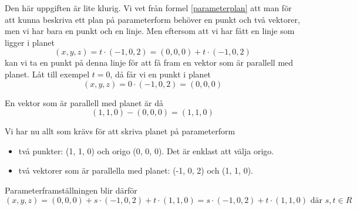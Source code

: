 \documentclass[../../main.tex]{subfiles}
\begin{document}
\begin{solution}{10}

Den här uppgiften är lite klurig. Vi vet från formel \ref{parameterplan} att man för att kunna beskriva ett plan på parameterform behöver en punkt och två vektorer, men vi har bara en punkt och en linje. Men eftersom att vi har fått en linje som ligger i planet 
\[(x, y, z) = t\cdot (-1, 0, 2) = (0, 0, 0) + t\cdot (-1, 0, 2)\]
kan vi ta en punkt på denna linje för att få fram en vektor som är parallell med planet. Låt till exempel $t = 0$, då får vi en punkt i planet
\[(x, y, z) = 0 \cdot (-1, 0, 2) = (0, 0, 0)\]

En vektor som är parallell med planet är då
\[(1, 1, 0) - (0, 0, 0) = (1, 1, 0)\] 

Vi har nu allt som krävs för att skriva planet på parameterform
\begin{itemize}
    \item två punkter: (1, 1, 0) och origo (0, 0, 0). Det är enklast att välja origo.
    \item två vektorer som är parallella med planet: (-1, 0, 2) och (1, 1, 0).
\end{itemize}

Parameterframställningen blir därför
\[(x, y, z) = (0, 0, 0) + s \cdot (-1, 0, 2) + t \cdot (1, 1, 0) = 
s \cdot (-1, 0, 2) + t \cdot (1, 1, 0) \text{ där } s, t \in R\]

\end{solution}
\end{document}
